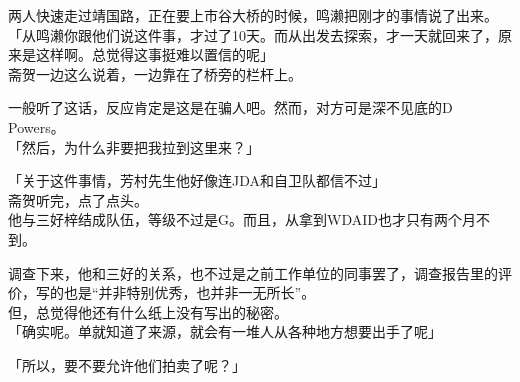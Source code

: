 两人快速走过靖国路，正在要上市谷大桥的时候，鸣濑把刚才的事情说了出来。\\

「从鸣濑你跟他们说这件事，才过了10天。而从出发去探索，才一天就回来了，原来是这样啊。总觉得这事挺难以置信的呢」\\

斋贺一边这么说着，一边靠在了桥旁的栏杆上。

一般听了这话，反应肯定是这是在骗人吧。然而，对方可是深不见底的D Powers。\\

「然后，为什么非要把我拉到这里来？」

「关于这件事情，芳村先生他好像连JDA和自卫队都信不过」\\

斋贺听完，点了点头。\\

他与三好梓结成队伍，等级不过是G。而且，从拿到WDAID也才只有两个月不到。

调查下来，他和三好的关系，也不过是之前工作单位的同事罢了，调查报告里的评价，写的也是“并非特别优秀，也并非一无所长”。\\

但，总觉得他还有什么纸上没有写出的秘密。\\

「确实呢。单就知道了来源，就会有一堆人从各种地方想要出手了呢」

「所以，要不要允许他们拍卖了呢？」

